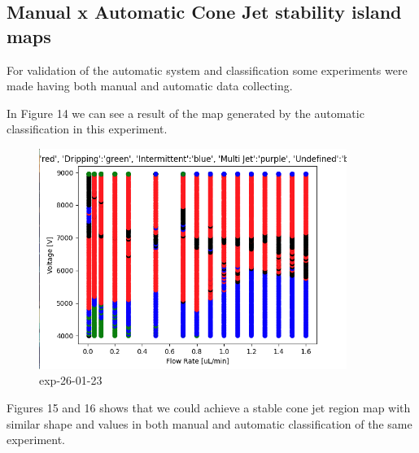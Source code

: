     \subsection{Manual x Automatic Cone Jet stability island maps}

        For validation of the automatic system and classification some experiments were made having both manual and automatic data collecting.



        In Figure 14 we can see a result of the map generated by the automatic classification in this experiment.

        \begin{figure}[H]
            \center
            \includegraphics[width=10cm]{Figuras/report3/map-exp-26-01.png}
            \caption{ exp-26-01-23 }
        \end{figure}

        Figures 15 and 16 shows that we could achieve a stable cone jet region map with similar shape and values in both manual and automatic classification of the same experiment.

